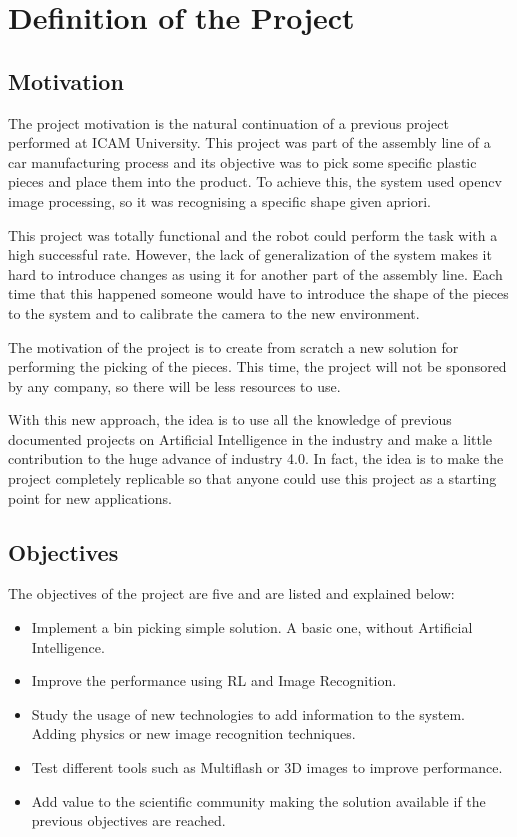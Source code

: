 \chapter{Definition of the Project}

	\section{Motivation}
		The project motivation is the natural continuation of a previous project performed at ICAM University. This project was part of the assembly line of a car manufacturing process and its objective was to pick some specific plastic pieces and place them into the product. To achieve this, the system used opencv image processing, so it was recognising a specific shape given apriori.
		
		This project was totally functional and the robot could perform the task with a high successful rate. However, the lack of generalization of the system makes it hard to introduce changes as using it for another part of the assembly line. Each time that this happened someone would have to introduce the shape of the pieces to the system and to calibrate the camera to the new environment. 
		
		The motivation of the project is to create from scratch a new solution for performing the picking of the pieces. This time, the project will not be sponsored by any company, so there will be less resources to use.
		
		With this new approach, the idea is to use all the knowledge of previous documented projects on Artificial Intelligence in the industry and make a little contribution to the huge advance of industry 4.0. In fact, the idea is to make the project completely replicable so that anyone could use this project as a starting point for new applications.

	\section{Objectives}
		The objectives of the project are five and are listed and explained below:
		
		\begin{itemize}
			\item[\textendash]Implement a bin picking simple solution. A basic one, without Artificial Intelligence.
			\item[\textendash]Improve the performance using RL and Image Recognition.
			\item[\textendash]Study the usage of new technologies to add information to the system. Adding physics or new image recognition techniques.
			\item[\textendash]Test different tools such as Multiflash or 3D images to improve performance.
			\item[\textendash]Add value to the scientific community making the solution available if the previous objectives are reached.
		\end{itemize}
	
